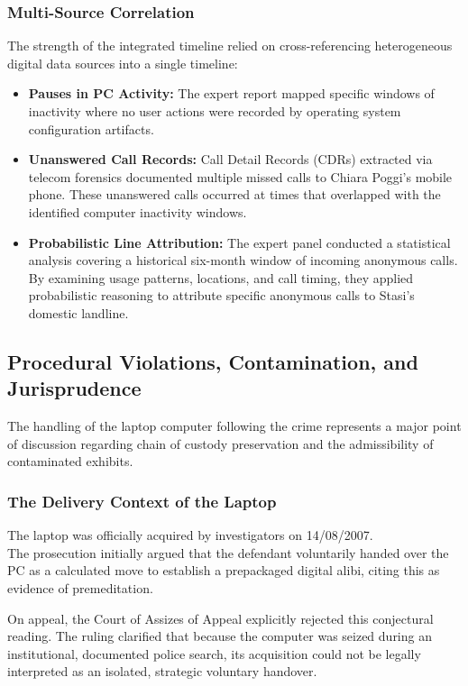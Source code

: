 \subsubsection*{Multi-Source Correlation}
The strength of the integrated timeline relied on cross-referencing heterogeneous digital data sources into a single timeline:
\begin{itemize}
    \item \textbf{Pauses in PC Activity:} The expert report mapped specific windows of inactivity where no user actions were recorded by operating system configuration artifacts.
    \item \textbf{Unanswered Call Records:} Call Detail Records (CDRs) extracted via telecom forensics documented multiple missed calls to Chiara Poggi's mobile phone. These unanswered calls occurred at times that overlapped with the identified computer inactivity windows.
    \item \textbf{Probabilistic Line Attribution:} The expert panel conducted a statistical analysis covering a historical six-month window of incoming anonymous calls. By examining usage patterns, locations, and call timing, they applied probabilistic reasoning to attribute specific anonymous calls to Stasi's domestic landline.
\end{itemize}

\subsection{Procedural Violations, Contamination, and Jurisprudence}
The handling of the laptop computer following the crime represents a major point of discussion regarding chain of custody preservation and the admissibility of contaminated exhibits.

\subsubsection*{The Delivery Context of the Laptop}
The laptop was officially acquired by investigators on 14/08/2007.\\
The prosecution initially argued that the defendant voluntarily handed over the PC as a calculated move to establish a prepackaged digital alibi, citing this as evidence of premeditation. 
\medskip

\noindent
On appeal, the Court of Assizes of Appeal explicitly rejected this conjectural reading. The ruling clarified that because the computer was seized during an institutional, documented police search, its acquisition could not be legally interpreted as an isolated, strategic voluntary handover.

